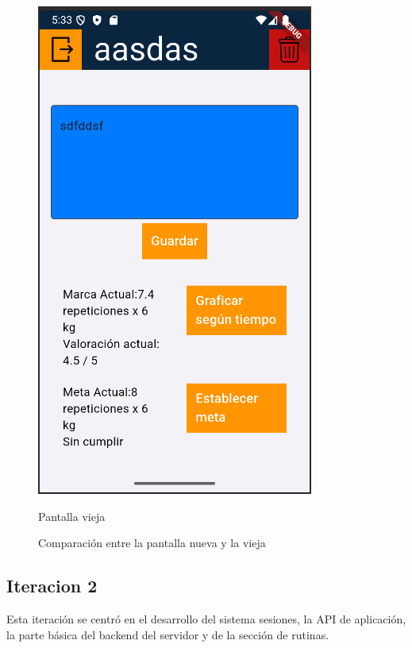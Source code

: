 \begin{figure}[h!]
\begin{minipage}[b]{0.45\textwidth}
    \includegraphics[width=\textwidth]{fotos/ejerciciosVieja.png}
    \caption{Pantalla vieja}
    \label{fig:imagen2}
  \end{minipage}
  \caption{Comparación entre la pantalla nueva y la vieja}
  \label{fig:imagen}
\end{figure}


\clearpage

\subsection{Iteracion 2}
Esta iteración se centró en el desarrollo del sistema sesiones, la API de aplicación, la parte básica del backend del servidor y de la sección de rutinas.

